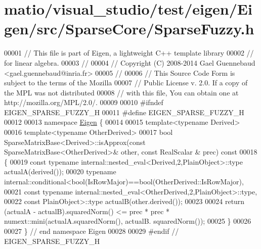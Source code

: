 \hypertarget{matio_2visual__studio_2test_2eigen_2_eigen_2src_2_sparse_core_2_sparse_fuzzy_8h_source}{}\section{matio/visual\+\_\+studio/test/eigen/\+Eigen/src/\+Sparse\+Core/\+Sparse\+Fuzzy.h}
\label{matio_2visual__studio_2test_2eigen_2_eigen_2src_2_sparse_core_2_sparse_fuzzy_8h_source}

\begin{DoxyCode}
00001 \textcolor{comment}{// This file is part of Eigen, a lightweight C++ template library}
00002 \textcolor{comment}{// for linear algebra.}
00003 \textcolor{comment}{//}
00004 \textcolor{comment}{// Copyright (C) 2008-2014 Gael Guennebaud <gael.guennebaud@inria.fr>}
00005 \textcolor{comment}{//}
00006 \textcolor{comment}{// This Source Code Form is subject to the terms of the Mozilla}
00007 \textcolor{comment}{// Public License v. 2.0. If a copy of the MPL was not distributed}
00008 \textcolor{comment}{// with this file, You can obtain one at http://mozilla.org/MPL/2.0/.}
00009 
00010 \textcolor{preprocessor}{#ifndef EIGEN\_SPARSE\_FUZZY\_H}
00011 \textcolor{preprocessor}{#define EIGEN\_SPARSE\_FUZZY\_H}
00012 
00013 \textcolor{keyword}{namespace }\hyperlink{namespace_eigen}{Eigen} \{
00014   
00015 \textcolor{keyword}{template}<\textcolor{keyword}{typename} Derived>
00016 \textcolor{keyword}{template}<\textcolor{keyword}{typename} OtherDerived>
00017 \textcolor{keywordtype}{bool} SparseMatrixBase<Derived>::isApprox(\textcolor{keyword}{const} SparseMatrixBase<OtherDerived>& other, \textcolor{keyword}{const} RealScalar &
      prec)\textcolor{keyword}{ const}
00018 \textcolor{keyword}{}\{
00019   \textcolor{keyword}{const} \textcolor{keyword}{typename} internal::nested\_eval<Derived,2,PlainObject>::type actualA(derived());
00020   \textcolor{keyword}{typename} internal::conditional<bool(IsRowMajor)==bool(OtherDerived::IsRowMajor),
00021     \textcolor{keyword}{const} \textcolor{keyword}{typename} internal::nested\_eval<OtherDerived,2,PlainObject>::type,
00022     \textcolor{keyword}{const} PlainObject>::type actualB(other.derived());
00023 
00024   \textcolor{keywordflow}{return} (actualA - actualB).squaredNorm() <= prec * prec * numext::mini(actualA.squaredNorm(), actualB.
      squaredNorm());
00025 \}
00026 
00027 \} \textcolor{comment}{// end namespace Eigen}
00028 
00029 \textcolor{preprocessor}{#endif // EIGEN\_SPARSE\_FUZZY\_H}
\end{DoxyCode}
